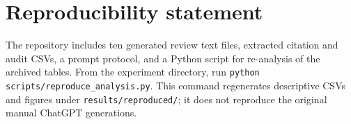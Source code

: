 \documentclass[11pt,a4paper]{article}
\begin{document}
\section*{Reproducibility statement}
The repository includes ten generated review text files, extracted citation and audit CSVs, a prompt protocol, and a Python script for re-analysis of the archived tables. From the experiment directory, run \texttt{python scripts/reproduce\_analysis.py}. This command regenerates descriptive CSVs and figures under \texttt{results/reproduced/}; it does not reproduce the original manual ChatGPT generations.
\end{document}
